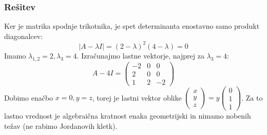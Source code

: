 \documentclass{article}
\begin{document}
\subsubsection*{Rešitev}
Ker je matrika spodnje trikotnika, je spet determinanta enostavno samo produkt diagonalcev:
\begin{equation*}
|A-\lambda I | = (2-\lambda)^2 (4-\lambda) = 0
\end{equation*}
Imamo $\lambda_{1,2} = 2, \lambda_3 = 4$.
Izračunajmo lastne vektorje, najprej za $\lambda_3=4$:
\begin{equation*}
A-4I = 
\begin{pmatrix}
-2 & 0 & 0 \\
2 & 0 & 0 \\
1 & 2 & -2
\end{pmatrix}
\end{equation*}
Dobimo enačbo $x=0, y=z$, torej je lastni vektor oblike $\begin{pmatrix} x \\ y \\ z \end{pmatrix} = y \begin{pmatrix} 0 \\ 1 \\ 1 \end{pmatrix}$.
Za to lastno vrednost je algebraična kratnost enaka geometrijski in nimamo nobenih težav (ne rabimo Jordanovih kletk).
\end{document}
